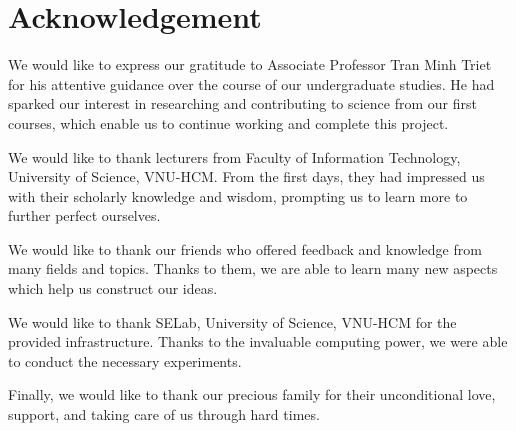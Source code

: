 \chapter{Acknowledgement}







We would like to express our gratitude to Associate Professor Tran Minh Triet for his attentive guidance over the course of our undergraduate studies. He had sparked our interest in researching and contributing to science from our first courses, which enable us to continue working and complete this project.

We would like to thank lecturers from Faculty of Information Technology, University of Science, VNU-HCM. From the first days, they had impressed us with their scholarly knowledge and wisdom, prompting us to learn more to further perfect ourselves.

We would like to thank our friends who offered feedback and knowledge from many fields and topics. Thanks to them, we are able to learn many new aspects which help us construct our ideas.

We would like to thank SELab, University of Science, VNU-HCM for the provided infrastructure. Thanks to the invaluable computing power, we were able to conduct the necessary experiments.

Finally, we would like to thank our precious family for their unconditional love, support, and taking care of us through hard times. 